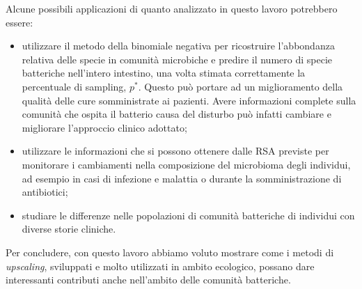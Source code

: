 Alcune possibili applicazioni di quanto analizzato in questo lavoro potrebbero essere:

\begin{itemize}

    \item utilizzare il metodo della binomiale negativa per ricostruire l'abbondanza relativa delle specie in comunità microbiche e predire il numero di specie batteriche nell'intero intestino, una volta stimata correttamente la percentuale di sampling, $p^*$. Questo può portare ad un miglioramento della qualità delle cure somministrate ai pazienti. Avere informazioni complete sulla comunità che ospita il batterio causa del disturbo può infatti cambiare e migliorare l'approccio clinico adottato;
    
    \item utilizzare le informazioni che si possono ottenere dalle RSA previste per monitorare i cambiamenti nella composizione del microbioma degli individui, ad esempio in casi di infezione e malattia o durante la somministrazione di antibiotici;
    
    \item studiare le differenze nelle popolazioni di comunità batteriche di individui con diverse storie cliniche.
    

\end{itemize}


Per concludere, con questo lavoro abbiamo voluto mostrare come i metodi di \emph{upscaling}, sviluppati e molto utilizzati in ambito ecologico, possano dare interessanti contributi anche nell'ambito delle comunità batteriche. 